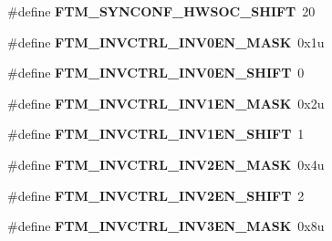 \begin{DoxyCompactItemize}
\item 
\#define {\bfseries F\+T\+M\+\_\+\+S\+Y\+N\+C\+O\+N\+F\+\_\+\+H\+W\+S\+O\+C\+\_\+\+S\+H\+I\+FT}~20\hypertarget{group__FTM__Register__Masks_ga1732b95468145109564e4fa367dfc2a8}{}\label{group__FTM__Register__Masks_ga1732b95468145109564e4fa367dfc2a8}

\item 
\#define {\bfseries F\+T\+M\+\_\+\+I\+N\+V\+C\+T\+R\+L\+\_\+\+I\+N\+V0\+E\+N\+\_\+\+M\+A\+SK}~0x1u\hypertarget{group__FTM__Register__Masks_ga29b0b3d76d82f4c673556bd71b97ee9d}{}\label{group__FTM__Register__Masks_ga29b0b3d76d82f4c673556bd71b97ee9d}

\item 
\#define {\bfseries F\+T\+M\+\_\+\+I\+N\+V\+C\+T\+R\+L\+\_\+\+I\+N\+V0\+E\+N\+\_\+\+S\+H\+I\+FT}~0\hypertarget{group__FTM__Register__Masks_ga15a13f74f3f9db42b9be7ce492976fef}{}\label{group__FTM__Register__Masks_ga15a13f74f3f9db42b9be7ce492976fef}

\item 
\#define {\bfseries F\+T\+M\+\_\+\+I\+N\+V\+C\+T\+R\+L\+\_\+\+I\+N\+V1\+E\+N\+\_\+\+M\+A\+SK}~0x2u\hypertarget{group__FTM__Register__Masks_gaaa85e1e86e9cc91e49e68c33a91d5194}{}\label{group__FTM__Register__Masks_gaaa85e1e86e9cc91e49e68c33a91d5194}

\item 
\#define {\bfseries F\+T\+M\+\_\+\+I\+N\+V\+C\+T\+R\+L\+\_\+\+I\+N\+V1\+E\+N\+\_\+\+S\+H\+I\+FT}~1\hypertarget{group__FTM__Register__Masks_ga6d544c535dc1c3710f37e5ed3f0e6acc}{}\label{group__FTM__Register__Masks_ga6d544c535dc1c3710f37e5ed3f0e6acc}

\item 
\#define {\bfseries F\+T\+M\+\_\+\+I\+N\+V\+C\+T\+R\+L\+\_\+\+I\+N\+V2\+E\+N\+\_\+\+M\+A\+SK}~0x4u\hypertarget{group__FTM__Register__Masks_ga529f3c3f58ca2c039fee08830dfe3a8a}{}\label{group__FTM__Register__Masks_ga529f3c3f58ca2c039fee08830dfe3a8a}

\item 
\#define {\bfseries F\+T\+M\+\_\+\+I\+N\+V\+C\+T\+R\+L\+\_\+\+I\+N\+V2\+E\+N\+\_\+\+S\+H\+I\+FT}~2\hypertarget{group__FTM__Register__Masks_gaf304b51f57fe6a028674e4de62558868}{}\label{group__FTM__Register__Masks_gaf304b51f57fe6a028674e4de62558868}

\item 
\#define {\bfseries F\+T\+M\+\_\+\+I\+N\+V\+C\+T\+R\+L\+\_\+\+I\+N\+V3\+E\+N\+\_\+\+M\+A\+SK}~0x8u\hypertarget{group__FTM__Register__Masks_ga1f9f536afb4e0b9b5041f35b51dc0008}{}\label{group__FTM__Register__Masks_ga1f9f536afb4e0b9b5041f35b51dc0008}


\end{DoxyCompactItemize}
